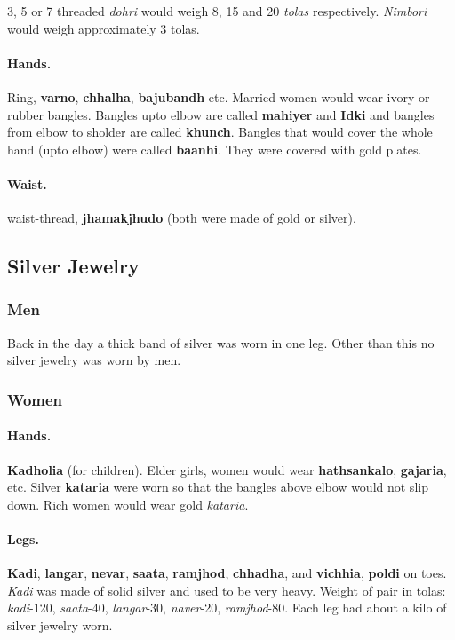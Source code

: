 3, 5 or 7 threaded \textit{dohri} would weigh 8, 15 and 20 \textit{tolas}
respectively. \textit{Nimbori} would weigh approximately 3 tolas.

\paragraph{Hands.} Ring, \textbf{varno}, \textbf{chhalha}, \textbf{bajubandh}
etc. Married women would wear ivory or rubber bangles. Bangles upto elbow are
called \textbf{mahiyer} and \textbf{Idki} and bangles from elbow to sholder are
called \textbf{khunch}. Bangles that would cover the whole hand (upto elbow)
were called \textbf{baanhi}. They were covered with gold plates.

\paragraph{Waist.} waist-thread, \textbf{jhamakjhudo} (both were made of gold or silver).

\subsection{Silver Jewelry}
\subsubsection*{Men} Back in the day a thick band of silver was worn in one leg. Other than this no silver jewelry was worn by men.

\subsubsection*{Women}

\paragraph{Hands.} \textbf{Kadholia} (for children). Elder girls, women would wear \textbf{hathsankalo}, \textbf{gajaria}, etc. Silver \textbf{kataria} were worn so that the bangles above elbow would not slip down. Rich women would wear gold \textit{kataria}.

\paragraph{Legs.} \textbf{Kadi}, \textbf{langar}, \textbf{nevar},
\textbf{saata},  \textbf{ramjhod}, \textbf{chhadha},  and \textbf{vichhia},
\textbf{poldi} on toes. \textit{Kadi} was made of solid silver and used to
be very heavy. Weight of pair in tolas: \textit{kadi}-120,
\textit{saata}-40, \textit{langar}-30, \textit{naver}-20,
\textit{ramjhod}-80. Each leg had about a kilo of silver jewelry worn. 

